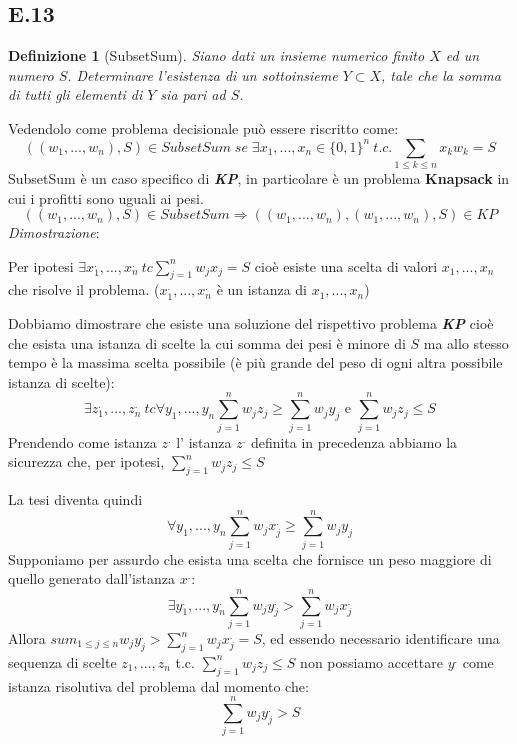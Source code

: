 \documentclass[a4paper]{article}
\newtheorem*{definition}{Definizione}
\newenvironment{dimostrazione}{\textit{Dimostrazione}:\begin{adjustwidth}{1cm}{}}{\end{adjustwidth}}
\newcommand{\imp}[1]{\textbf{\textit{#1}}}
\begin{document}
\subsection{E.13}
\begin{definition}[SubsetSum]
	Siano dati un insieme numerico finito $X$ ed un numero $S$. Determinare l’esistenza di un sottoinsieme $Y \subset X$, tale che la somma di tutti gli elementi di $Y$ sia pari ad $S$.
\end{definition}
	Vedendolo come problema decisionale può essere riscritto come:
	$$((w_1,...,w_n),S) \in SubsetSum \; se \; \exists x_1, ... , x_n \in \{0,1\}^n \: t.c. \sum_{1 \leq k \leq n} x_kw_k = S$$
	SubsetSum è un caso specifico di \imp{KP}, in particolare è un problema \textbf{Knapsack} in cui i profitti sono uguali ai pesi.
	$$((w_1,...,w_n),S) \in SubsetSum \Rightarrow ((w_1,...,w_n),(w_1,...,w_n),S) \in KP$$
\begin{dimostrazione}
	Per ipotesi $\exists x_1^., ..., x_n^. \: tc \sum_{j=1}^n w_jx_j = S$ cioè esiste una scelta di valori $x_1,...,x_n$ che risolve il problema. ($x_1^., ..., x_n^.$ è un istanza di $x_1, ..., x_n$)

	Dobbiamo dimostrare che esiste una soluzione del rispettivo problema \imp{KP} cioè che esista una istanza di scelte la cui somma dei pesi è minore di $S$ ma allo stesso tempo è la massima scelta possibile (è più grande del peso di ogni altra possibile istanza di scelte):
	$$ \exists z_1^., ..., z_n^. \: tc \forall y_1,...,y_n \sum_{j=1}^n w_jz_j \geq \sum_{j=1}^n w_jy_j \text{ e } \sum_{j=1}^n w_jz_j \leq S$$
	Prendendo come istanza $z^.$ l' istanza $z^.$ definita in precedenza abbiamo la sicurezza che, per ipotesi, $\sum_{j=1}^n w_jz_j \leq S$

	La tesi diventa quindi $$ \forall y_1,...,y_n \sum_{j=1}^n w_jx_j^. \geq \sum_{j=1}^n w_jy_j$$
Supponiamo per assurdo che esista una scelta che fornisce un peso maggiore di quello generato dall'istanza $x^.$:$$\exists y_1^.,...,y_n^. \sum_{j=1}^n w_jy_j^. > \sum_{j=1}^n w_jx_j^.$$
Allora $sum_{1 \leq j \leq n} w_jy_j^. > \sum_{j=1}^n w_jx_j^. = S $, ed essendo necessario identificare una sequenza di scelte $z_1,...,z_n$ t.c. $\sum_{j=1}^n w_jz_j \leq S$ non possiamo accettare $y^.$ come istanza risolutiva del problema dal momento che:
$$\sum_{j=1}^n w_jy_j^. > S $$
\end{dimostrazione}
\end{document}

